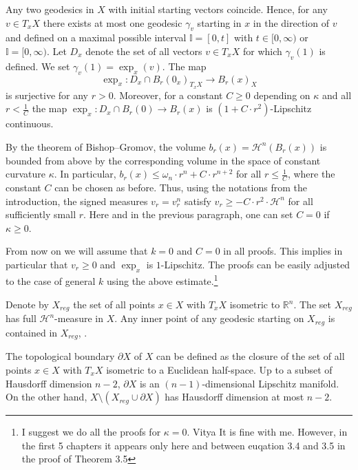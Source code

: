 \documentclass[12pt,leqno,intlimits]{amsart}
\numberwithin{equation}{section}
\theoremstyle{definition}
\theoremstyle{remark}
\newcommand{\R}{\mathbb{R}}
\newcommand{\II}{\mathbb{I}}
\def\:{\colon}
\begin{document}
Any two geodesics in $X$ with initial starting vectors coincide. Hence,
for any $v\in T_xX$ there exists at most one geodesic $\gamma _v$  starting in $x$ in the direction of $v$ and defined on a maximal possible interval $\II =[0,t]$ with $t\in [0, \infty )$
or $\II=[0,\infty)$.  Let $D_x$ denote the set of all vectors $v\in T_xX$ for which $\gamma _v(1)$ is defined.
We set $\gamma _v (1)=\exp_x (v)$. 
The map 
\[\exp_x \:D_x \cap B_r(0_x)_{T_xX} \to B_r(x)_X\] 
is surjective for any $r>0$.
Moreover, for a constant $C\geq 0$ depending on $\kappa$ and all $r< \frac 1 C$ the map $\exp_x \:D_x \cap B_r(0) \to B_r(x)$ is  $(1+ C \cdot  r^2)$-Lipschitz continuous.



By the theorem of Bishop--Gromov, the volume $b_r (x)=\mathcal H^n (B_r(x))$ is bounded from above by the corresponding volume in the
space of constant curvature $\kappa$. 
In particular, $b_r (x) \leq \omega _n \cdot r^n + C \cdot r^{n+2}$ for all $r\leq \frac 1 C$, where
the constant $C$ can be chosen as before.  Thus, using the notations from the introduction, the signed measures $v_r  =v_r^n $ satisfy
$v_r \geq -C\cdot r^2\cdot  \mathcal H^n$  for all sufficiently small $r$.
 Here and in the previous paragraph,  one can set $C=0$ if $\kappa \geq 0$.

 {\color{red} From now on we will assume that $k=0$ and $C=0$ in all proofs. This implies in particular that $v_r\ge 0$ and $\exp_x$ is $1$-Lipschitz. The proofs can be  easily adjusted to the case of general $k$ using the above estimate.}\footnote{{\color{red}I suggest we do all the proofs for $\kappa=0$. Vitya}  
 It is fine with me. However, in the first 5 chapters it appears only here and  between euqation 3.4 and 3.5 in the proof of Theorem 3.5} 


Denote by $X_{reg}$ the set of all points $x\in X$ with $T_xX$   isometric to $\R^n$.  The set $X_{reg}$ has full $\mathcal H^n$-measure in $X$.
Any inner point of any geodesic starting on $X_{reg}$ is contained in $X_{reg}$, \cite{Petparallel}.


The topological boundary $\partial X$ of $X$ can be defined as the closure of the  set of all points $x\in X$ with $T_xX$ isometric to a Euclidean half-space. Up to a subset of Hausdorff dimension $n-2$, $\partial X$ is an $(n-1)$-dimensional Lipschitz manifold. On the other hand, $X\setminus (X_{reg} \cup \partial X)$ has Hausdorff dimension at most $n-2$.
\end{document}
